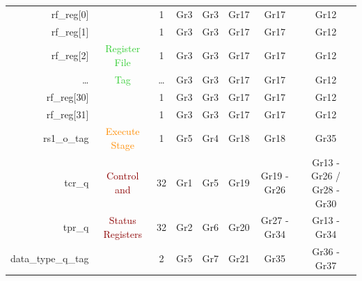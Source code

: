 \begin{table}[t]
\begin{tabular}{@{}rccccccc@{}}
        rf\_reg[0]                      &                                       & 1      & Gr3                         & Gr3                         & Gr17                        & Gr17                        & Gr12                        \\
        rf\_reg[1]                      &                                       & 1      & Gr3                         & Gr3                         & Gr17                        & Gr17                        & Gr12                        \\
        rf\_reg[2]                      & \textcolor{LimeGreen}{Register File}  & 1      & Gr3                         & Gr3                         & Gr17                        & Gr17                        & Gr12                        \\
        \ldots                          & \textcolor{LimeGreen}{Tag}            & \ldots & Gr3                         & Gr3                         & Gr17                        & Gr17                        & Gr12                        \\
        rf\_reg[30]                     &                                       & 1      & Gr3                         & Gr3                         & Gr17                        & Gr17                        & Gr12                        \\
        rf\_reg[31]                     &                                       & 1      & Gr3                         & Gr3                         & Gr17                        & Gr17                        & Gr12                        \\\hdashline
        rs1\_o\_tag                     & \textcolor{DarkOrange}{Execute Stage} & 1      & Gr5                         & Gr4                         & Gr18                        & Gr18                        & Gr35                        \\\hdashline
        tcr\_q                          & \textcolor{DarkRed}{Control and}      & 32     & Gr1                         & Gr5                         & Gr19                        & Gr19 - Gr26                 & Gr13 - Gr26 / Gr28 - Gr30   \\
        tpr\_q                          & \textcolor{DarkRed}{Status Registers} & 32     & Gr2                         & Gr6                         & Gr20                        & Gr27 - Gr34                 & Gr13 - Gr34                 \\\hdashline
        data\_type\_q\_tag              &                                       & 2      & Gr5                         & Gr7                         & Gr21                        & Gr35                        & Gr36 - Gr37                 \\

\end{tabular}
\end{table}

